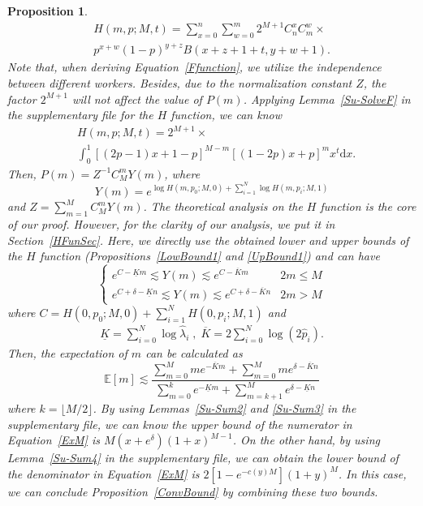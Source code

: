 \documentclass{article}
\makeatletter
\newtheorem{proposition}[theorem]{Proposition}
\renewenvironment{proof}[1][\proofname]{\par
  \vspace{-\topsep}%
  \pushQED{\qed}%
  \normalfont
  \topsep0pt \partopsep0pt %
  \trivlist
  \item[\hskip\labelsep
        \itshape
    #1\@addpunct{.}]\ignorespaces
}{%
  \popQED\endtrivlist\@endpefalse
  \addvspace{0pt plus 0pt} %
}
\makeatother
\begin{document}
\begin{proposition}
\begin{proof}
\begin{equation}
\label{Ffunction}
\begin{split}
H(m,p;M,t)={\sum}_{x=0}^{n}{\sum}_{w=0}^{m} 2^{M+1}C_{n}^{x}C_{m}^{w}\times\\
p^{x+w}(1-p)^{y+z}B(x+z+1+t,y+w+1).
\end{split}
\end{equation}
Note that, when deriving Equation~\ref{Ffunction}, we utilize the independence between different workers. Besides, due to the normalization constant $Z$, the factor $2^{M+1}$ will not affect the value of $P(m)$.
Applying Lemma~\ref{Su-SolveF} in the supplementary file for the $H$ function, we can know
\begin{align}
&H(m,p;M,t)=2^{M+1}\times \label{Hfunction}\\
&\int_{0}^{1}[(2p-1)x+1-p]^{M-m}[(1-2p)x+p]^{m}x^t\mathrm{d}x. \nonumber
\end{align}
Then, $P(m)=Z^{-1}C_{M}^{m}Y(m)$, where
\begin{equation}
\label{PDist}
Y(m) =e^{\log H(m,p_0;M,0)+\sum_{i=1}^{N}\log H(m,p_i;M,1)}
\end{equation}
and $Z=\sum_{m=1}^{M}C_{M}^{m}Y(m)$. 
The theoretical analysis on the $H$ function is the core of our proof. However, for the clarity of our analysis, we put it in Section~\ref{HFunSec}.
Here, we directly use the obtained lower and upper bounds of the $H$ function (Propositions~\ref{LowBound1} and \ref{UpBound1}) and can have
\begin{equation}
\left\{
\begin{array}{lc}
e^{C-\underline{K}m}\lesssim Y(m) \lesssim e^{C-\overline{K}m} & 2m\leq M\\
e^{C+\delta-\underline{K}n}\lesssim Y(m) \lesssim e^{C+\delta-\overline{K}n} & 2m>M
\end{array}
\right.
\end{equation}
where $C=H(0,p_0;M,0)+\sum_{i=1}^{N}H(0,p_i;M,1)$ and
\begin{equation*}
\begin{split}
\underline{K} = {\sum}_{i=0}^{N}\log \hat{\lambda}_{i}\;,\; \overline{K} =  2{\sum}_{i=0}^{N}\log \left(2\hat{p}_i\right).
\end{split}
\end{equation*}
Then, the expectation of $m$ can be calculated as
\begin{equation}
\label{ExM}
\mathbb{E}[m] \lesssim \frac{\sum_{m=0}^{M}me^{-\overline{K}m}+\sum_{m=0}^{M}me^{\delta-\overline{K}n}}{\sum_{m=0}^{k}e^{-\underline{K}m}+\sum_{m=k+1}^{M}e^{\delta-\underline{K}n}}
\end{equation}
where $k=\lfloor M/2 \rfloor$. By using Lemmas~\ref{Su-Sum2} and \ref{Su-Sum3} in the supplementary file, we can know the upper bound of the numerator in Equation~\ref{ExM} is $M(x+e^{\delta})(1+x)^{M-1}$. On the other hand, by using Lemma~\ref{Su-Sum4} in the supplementary file, we can obtain the lower bound of the denominator in Equation~\ref{ExM} is $2[1-e^{-c(y)M}](1+y)^{M}$. In this case, we can conclude Proposition~\ref{ConvBound} by combining these two bounds.
\end{proof}
\end{proposition}
\end{document}
